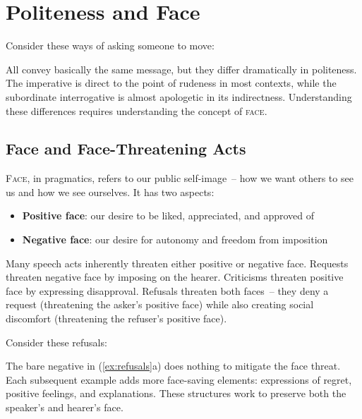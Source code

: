 \section{Politeness and Face}\label{sec:politeness}

Consider these ways of asking someone to move:
\ea
    \z
\z

All convey basically the same message, but they differ dramatically in politeness. The imperative is direct to the point of rudeness in most contexts, while the subordinate interrogative is almost apologetic in its indirectness. Understanding these differences requires understanding the concept of \textsc{face}.

\subsection{Face and Face-Threatening Acts}

\textsc{Face}, in pragmatics, refers to our public self-image~-- how we want others to see us and how we see ourselves. It has two aspects:
\begin{itemize}[noitemsep]
    \item \textbf{Positive face}: our desire to be liked, appreciated, and approved of 
    \item \textbf{Negative face}: our desire for autonomy and freedom from imposition 
\end{itemize}

Many speech acts inherently threaten either positive or negative face. Requests threaten negative face by imposing on the hearer. Criticisms threaten positive face by expressing disapproval. Refusals threaten both faces~-- they deny a request (threatening the asker's positive face) while also creating social discomfort (threatening the refuser's positive face).

Consider these refusals:
\ea \label{ex:refusals}
    \z
\z

The bare negative in (\ref{ex:refusals}a) does nothing to mitigate the face threat. Each subsequent example adds more face-saving elements: expressions of regret, positive feelings, and explanations. These structures work to preserve both the speaker's and hearer's face.

